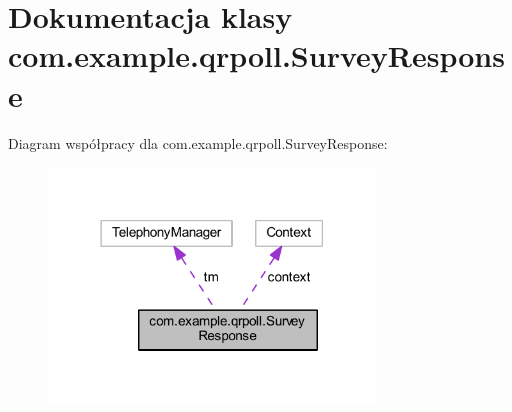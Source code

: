 \hypertarget{classcom_1_1example_1_1qrpoll_1_1_survey_response}{\section{Dokumentacja klasy com.\+example.\+qrpoll.\+Survey\+Response}
\label{classcom_1_1example_1_1qrpoll_1_1_survey_response}
}


Diagram współpracy dla com.\+example.\+qrpoll.\+Survey\+Response\+:
\nopagebreak
\begin{figure}[H]
\begin{center}
\leavevmode
\includegraphics[width=246pt]{classcom_1_1example_1_1qrpoll_1_1_survey_response__coll__graph}
\end{center}
\end{figure}

